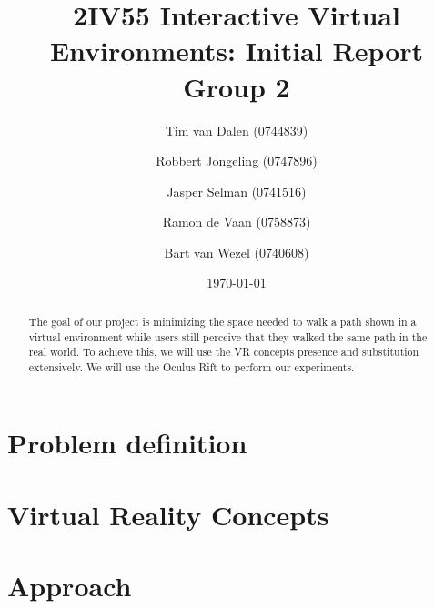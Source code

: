 \documentclass[a4paper,11pt]{article}
\title{
	2IV55 Interactive Virtual Environments: Initial Report Group 2
}
\author{
	Tim van Dalen (0744839)
	\and
	Robbert Jongeling (0747896)
	\and
	Jasper Selman (0741516)
	\and
	Ramon de Vaan (0758873)
	\and
	Bart van Wezel (0740608)
}
\date{\today}
\begin{document}
	\maketitle
	
	\begin{abstract}
		The goal of our project is minimizing the space needed to walk a path shown in a virtual environment while users still perceive that they walked the same path in the real world.
		To achieve this, we will use the VR concepts presence and substitution extensively.
		We will use the Oculus Rift to perform our experiments.
	\end{abstract}
	
	\section{Problem definition}
	\label{sec:problem}
	
	
	\section{Virtual Reality Concepts}
	\label{sec:vr}
	
	
	\section{Approach}
	\label{sec:approach}
	
	
	
\end{document}
